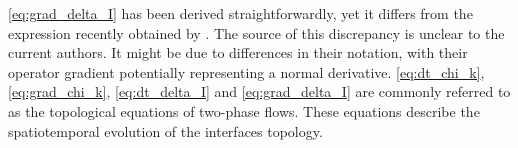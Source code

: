 \ref{eq:grad_delta_I} has been derived straightforwardly, yet it differs from the expression recently obtained by \citet{orlando2023evolution}.  The source of this discrepancy is unclear to the current authors. 
It might be due to differences in their notation, with their operator gradient potentially representing a normal derivative. 
\ref{eq:dt_chi_k}, \ref{eq:grad_chi_k}, \ref{eq:dt_delta_I} and \ref{eq:grad_delta_I}  are commonly referred to as the topological equations of two-phase flows.
These equations describe the spatiotemporal evolution of the interfaces topology.

